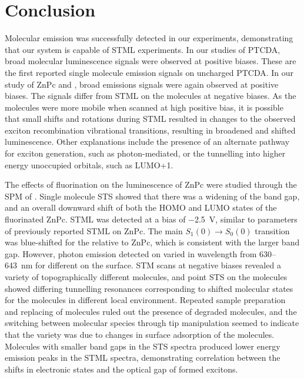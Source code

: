 
\chapter{Conclusion}
\label{ch:conc}


Molecular emission was successfully detected in our experiments, demonstrating that our system is capable of \ac{STML} experiments. In our studies of PTCDA, broad molecular luminescence signals were observed at positive biases. These are the first reported single molecule emission signals on uncharged \ac{PTCDA}. In our study of \ac{ZnPc} and , broad emissions signals were again observed at positive biases. The signals differ from \ac{STML} on the molecules at negative biases. As the molecules were more mobile when scanned at high positive bias, it is possible that small shifts and rotations during \ac{STML} resulted in changes to the observed exciton recombination vibrational transitions, resulting in broadened and shifted luminescence. Other explanations include the presence of an alternate pathway for exciton generation, such as photon-mediated, or the tunnelling into higher energy unoccupied orbitals, such as LUMO+1. 

The effects of fluorination on the luminescence of ZnPc were studied through the \ac{SPM} of . Single molecule \ac{STS} showed that there was a widening of the band gap, and an overall downward shift of both the HOMO and LUMO states of the fluorinated ZnPc. \ac{STML} was detected at a bias of \SI{-2.5}{V}, similar to parameters of previously reported \ac{STML} on ZnPc. The main $S_1(0) \rightarrow S_0(0)$ transition was blue-shifted for the  relative to ZnPc, which is consistent with the larger band gap. However, photon emission detected on  varied in wavelength from 630--\SI{643}{nm} for different  on the surface. \ac{STM} scans at negative biases revealed a variety of topographically different molecules, and point \ac{STS} on the molecules showed differing tunnelling resonances corresponding to shifted molecular states for the molecules in different local environment. Repeated sample preparation and replacing of molecules ruled out the presence of degraded molecules, and the switching between molecular species through tip manipulation seemed to indicate that the variety was due to changes in surface adsorption of the molecules. Molecules with smaller band gaps in the \ac{STS} spectra produced lower energy emission peaks in the \ac{STML} spectra, demonstrating correlation between the shifts in electronic states and the optical gap of formed excitons.

